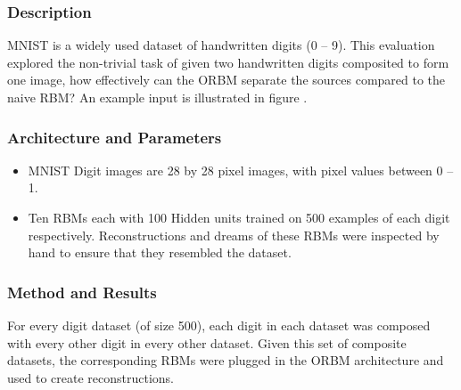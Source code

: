   \subsubsection{Description}
  MNIST is a widely used dataset of handwritten digits (0 -- 9). This evaluation explored the non-trivial task of given two handwritten digits composited to form one image, how effectively can the ORBM separate the sources compared to the naive RBM? An example input is illustrated in figure \todocite{\ref{}}.

  \subsubsection{Architecture and Parameters}

  \begin{itemize}
    \item MNIST Digit images are 28 by 28 pixel images, with pixel values between 0 -- 1.
    \item Ten RBMs each with 100 Hidden units trained on 500 examples of each digit respectively. Reconstructions and dreams of these RBMs were inspected by hand to ensure that they resembled the dataset.
  \end{itemize}

  \subsubsection{Method and Results}

  For every digit dataset (of size 500), each digit in each dataset was composed with every other digit in every other dataset. Given this set of composite datasets, the corresponding RBMs were plugged in the ORBM architecture and used to create reconstructions.

